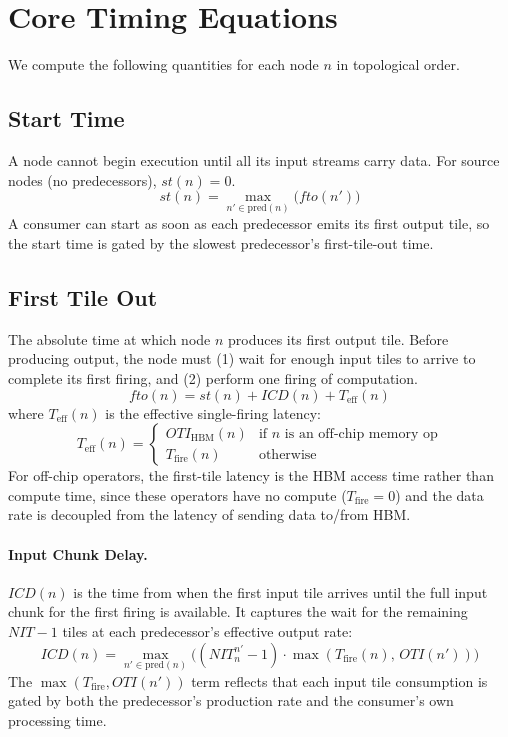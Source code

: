 \documentclass[10pt]{article}
\begin{document}
\section{Core Timing Equations}

We compute the following quantities for each node $n$ in topological order.

\subsection{Start Time}

A node cannot begin execution until all its input streams carry data. For source nodes (no predecessors), $\mathit{st}(n) = 0$.
\begin{equation}
    \mathit{st}(n) = \max_{n' \in \text{pred}(n)} \bigl(\mathit{fto}(n')\bigr)
\end{equation}
A consumer can start as soon as each predecessor emits its first output tile, so the start time is gated by the slowest predecessor's first-tile-out time.

\subsection{First Tile Out}

The absolute time at which node $n$ produces its first output tile. Before producing output, the node must (1) wait for enough input tiles to arrive to complete its first firing, and (2) perform one firing of computation.
\begin{equation}
    \mathit{fto}(n) = \mathit{st}(n) + \mathit{ICD}(n) + T_{\text{eff}}(n)
\end{equation}
where $T_{\text{eff}}(n)$ is the effective single-firing latency:
\begin{equation}
    T_{\text{eff}}(n) = \begin{cases}
        \mathit{OTI}_{\text{HBM}}(n) & \text{if } n \text{ is an off-chip memory op} \\
        T_{\text{fire}}(n) & \text{otherwise}
    \end{cases}
\end{equation}
For off-chip operators, the first-tile latency is the HBM access time rather than compute time, since these operators have no compute ($T_{\text{fire}} = 0$) and the data rate is decoupled from the latency of sending data to/from HBM.

\paragraph{Input Chunk Delay.}
$\mathit{ICD}(n)$ is the time from when the first input tile arrives until the full input chunk for the first firing is available. It captures the wait for the remaining $\mathit{NIT} - 1$ tiles at each predecessor's effective output rate:
\begin{equation}
    \mathit{ICD}(n) = \max_{n' \in \text{pred}(n)} \bigl((\mathit{NIT}^{n'}_n - 1) \cdot \max(T_{\text{fire}}(n),\, \mathit{OTI}(n'))\bigr)
\end{equation}
The $\max(T_{\text{fire}}, \mathit{OTI}(n'))$ term reflects that each input tile consumption is gated by both the predecessor's production rate and the consumer's own processing time.
\end{document}
